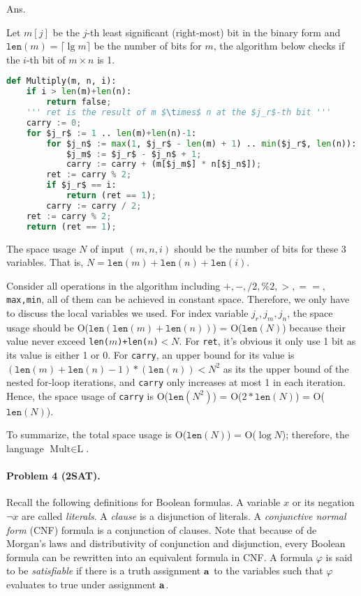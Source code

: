 \documentclass[11pt]{article}
\begin{document}
Ans.

\newcommand{\len}{\ensuremath{\mathtt{len}}}

Let $m[j]$ be the $j$-th least significant (right-most) bit in the binary form
and $\len(m) = \lceil \lg m \rceil$ be the number of bits for $m$,
the algorithm below checks if the $i$-th bit of $m \times n$ is 1.

\begin{lstlisting}[language=Python, mathescape=true]
def Multiply(m, n, i):
    if i > len(m)+len(n):
        return false;
    ''' ret is the result of m $\times$ n at the $j_r$-th bit '''
    carry := 0;
    for $j_r$ := 1 .. len(m)+len(n)-1:
        for $j_n$ := max(1, $j_r$ - len(m) + 1) .. min($j_r$, len(n)):
            $j_m$ := $j_r$ - $j_n$ + 1;
            carry := carry + (m[$j_m$] * n[$j_n$]);
        ret := carry % 2;
        if $j_r$ == i:
            return (ret == 1);
        carry := carry / 2;
    ret := carry % 2; 
    return (ret == 1);
\end{lstlisting}

The space usage $N$ of input $(m, n, i)$ should be the number of bits for these 3 variables.
That is, $N=\len(m) + \len(n) +\len(i)$.

Consider all operations in the algorithm including $+,-,/2,\%2,>,==,$ \texttt{max,min},
all of them can be achieved in constant space.
Therefore, we only have to discuss the local variables we used.
For index variable $j_r, j_m, j_n$, the space usage should be O($\len(\len(m)+\len(n))$) = O($\len(N)$)
because their value never exceed \texttt{len($m$)+len($n$)}$ < N$.
For \texttt{ret}, it's obvious it only use 1 bit as its value is either 1 or 0.
For \texttt{carry}, an upper bound for its value is $(\len(m)+\len(n)-1)*(\len(n)) < N^2$
as its the upper bound of the nested for-loop iterations,
and \texttt{carry} only increases at most 1 in each iteration.
Hence, the space usage of \texttt{carry} is O($\len(N^2)$) = O($2*\len(N)$) = O($\len(N)$).

To summarize, the total space usage is O($\len(N)$) = O($\log N$);
therefore, the language $\mbox{Mult} \in \mbox{L}$.

\paragraph{Problem 4 (2SAT).}
Recall the following definitions for Boolean formulas. A variable $x$
or its negation $\neg x$ are called \emph{literals}. A \emph{clause}
is a disjunction of literals. A \emph{conjunctive normal form} (CNF)
formula is a conjunction of clauses. Note that because of de Morgan's
laws and distributivity of conjunction and disjunction, every Boolean
formula can be rewritten into an equivalent formula in CNF. A formula
$\varphi$ is said to be \emph{satisfiable} if there is a truth
assignment ${\bf a}$ to the variables such that $\varphi$ evaluates to
true under assignment ${\bf a}$.
\end{document}
